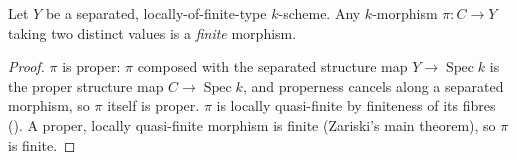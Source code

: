 \begin{proposition}
  \label{thm:adelic_nonconstant_map_isFinite}
  \leanok
  Let \(Y\) be a separated, locally-of-finite-type \(k\)-scheme. Any
  \(k\)-morphism \(\pi \colon C \to Y\) taking two distinct values is a
  \emph{finite} morphism.
\end{proposition}
\begin{proof}
  \leanok
  \(\pi\) is proper: \(\pi\) composed with the separated structure map
  \(Y \to \operatorname{Spec} k\) is the proper structure map
  \(C \to \operatorname{Spec} k\), and properness cancels along a
  separated morphism, so \(\pi\) itself is proper.
  \(\pi\) is locally quasi-finite by finiteness of its fibres
  (). A proper, locally
  quasi-finite morphism is finite (Zariski's main theorem), so \(\pi\)
  is finite.
\end{proof}

